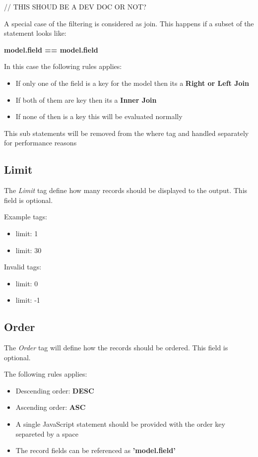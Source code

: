// THIS SHOUD BE A DEV DOC OR NOT?

A special case of the filtering is considered as join. 
This happens if a subset of the statement looks like:\newline

\textbf{{model}.{field} == {model}.{field}}\newline

In this case the following rules applies:

\begin{itemize}
	\item If only one of the field is a key for the model then its a \textbf{Right or Left Join}
	\item If both of them are key then its a \textbf{Inner Join}
	\item If none of then is a key this will be evaluated normally
\end{itemize}

This sub statements will be removed from the where tag and handled separately for performance reasons

\subsection{Limit}

The \textit{Limit} tag define how many records should be displayed to the output.
This field is optional.

Example tags:
\begin{itemize}
	\item limit: 1
	\item limit: 30
\end{itemize}

Invalid tags:
\begin{itemize}
	\item limit: 0
	\item limit: -1
\end{itemize}

\subsection{Order}

The \textit{Order} tag will define how the records should be ordered.
This field is optional.

The following rules applies:

\begin{itemize}
	\item Descending order: \textbf{DESC}
	\item Ascending order: \textbf{ASC}
	\item A single JavaScript statement should be provided with the order key separeted by a space
	\item The record fields can be referenced as \textbf{'{model}.{field}'}
\end{itemize}


